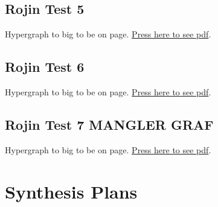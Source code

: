 \documentclass[a4paper,10pt,titlepage]{paper}
\begin{document}
\subsection{Rojin Test 5}
\begin{flushleft}
Hypergraph to big to be on page. \href{RojinGrafer/test5.pdf}{Press here to see pdf}.
\end{flushleft}
\label{Appendix::Rojin5}

\subsection{Rojin Test 6}
\begin{flushleft}
Hypergraph to big to be on page. \href{RojinGrafer/test6.pdf}{Press here to see pdf}.
\end{flushleft}
\label{Appendix::Rojin6}

\subsection{Rojin Test 7 MANGLER GRAF}
\begin{flushleft}
Hypergraph to big to be on page. \href{RojinGrafer/test5.pdf}{Press here to see pdf}.
\end{flushleft}
\label{Appendix::Rojin7}

\section{Synthesis Plans}
\end{document}
